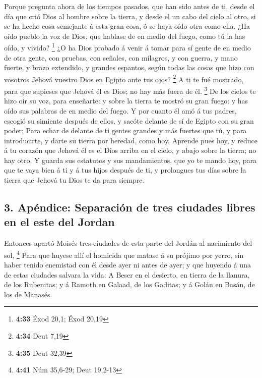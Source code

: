  Porque pregunta ahora de los tiempos pasados, que han sido
antes de ti, desde el día que crió Dios al hombre sobre la tierra, y
desde el un cabo del cielo al otro, si se ha hecho cosa semejante á esta
gran cosa, ó se haya oído otra como ella.  ¿Ha oído pueblo
la voz de Dios, que hablase de en medio del fuego, como tú la has oído,
y vivido? \footnote{\textbf{4:33} Éxod 20,1; Éxod 20,19} 
¿O ha Dios probado á venir á tomar para sí gente de en medio de otra
gente, con pruebas, con señales, con milagros, y con guerra, y mano
fuerte, y brazo extendido, y grandes espantos, según todas las cosas que
hizo con vosotros Jehová vuestro Dios en Egipto ante tus ojos?
\footnote{\textbf{4:34} Deut 7,19}  A ti te fué mostrado,
para que supieses que Jehová él es Dios; no hay más fuera de él.
\footnote{\textbf{4:35} Deut 32,39}  De los cielos te hizo
oir su voz, para enseñarte: y sobre la tierra te mostró su gran fuego: y
has oído sus palabras de en medio del fuego.  Y por cuanto
él amó á tus padres, escogió su simiente después de ellos, y sacóte
delante de sí de Egipto con su gran poder;  Para echar de
delante de ti gentes grandes y más fuertes que tú, y para introducirte,
y darte su tierra por heredad, como hoy.  Aprende pues hoy,
y reduce á tu corazón que Jehová él es el Dios arriba en el cielo, y
abajo sobre la tierra; no hay otro.  Y guarda sus estatutos
y sus mandamientos, que yo te mando hoy, para que te vaya bien á ti y á
tus hijos después de ti, y prolongues tus días sobre la tierra que
Jehová tu Dios te da para siempre.

\hypertarget{apuxe9ndice-separaciuxf3n-de-tres-ciudades-libres-en-el-este-del-jordan}{%
\subsection{3. Apéndice: Separación de tres ciudades libres en el este
del
Jordan}\label{apuxe9ndice-separaciuxf3n-de-tres-ciudades-libres-en-el-este-del-jordan}}

 Entonces apartó Moisés tres ciudades de esta parte del
Jordán al nacimiento del sol, \footnote{\textbf{4:41} Núm 35,6-29; Deut
  19,2-13}  Para que huyese allí el homicida que matase á
su prójimo por yerro, sin haber tenido enemistad con él desde ayer ni
antes de ayer; y que huyendo á una de estas ciudades salvara la vida:
 A Beser en el desierto, en tierra de la llanura, de los
Rubenitas; y á Ramoth en Galaad, de los Gaditas; y á Golán en Basán, de
los de Manasés.

